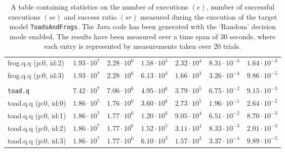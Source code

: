 \begin{table}[htbp]
{\begin{tabular}{lrrrrrr}
\hspace{3mm}frog.q.q (p:0, id:2)              & $1.93 \cdot 10^{7}$ & $2.28 \cdot 10^{6}$ & $1.58 \cdot 10^{5}$ & $2.32 \cdot 10^{4}$ & $8.31 \cdot 10^{-3}$ & $1.64 \cdot 10^{-3}$ \\
\hspace{3mm}frog.q.q (p:0, id:3)              & $1.93 \cdot 10^{7}$ & $2.28 \cdot 10^{6}$ & $6.13 \cdot 10^{3}$ & $1.66 \cdot 10^{3}$ & $3.26 \cdot 10^{-4}$ & $9.86 \cdot 10^{-5}$ \\
\\[-8pt]\texttt{toad.q}                       & $7.42 \cdot 10^{7}$ & $7.06 \cdot 10^{6}$ & $4.95 \cdot 10^{6}$ & $3.79 \cdot 10^{5}$ & $6.75 \cdot 10^{-2}$ & $9.15 \cdot 10^{-3}$ \\
\hspace{3mm}toad.q.q (p:0, id:0)              & $1.86 \cdot 10^{7}$ & $1.76 \cdot 10^{6}$ & $3.60 \cdot 10^{6}$ & $2.73 \cdot 10^{5}$ & $1.96 \cdot 10^{-1}$ & $2.64 \cdot 10^{-2}$ \\
\hspace{3mm}toad.q.q (p:0, id:1)              & $1.86 \cdot 10^{7}$ & $1.77 \cdot 10^{6}$ & $1.20 \cdot 10^{6}$ & $9.05 \cdot 10^{4}$ & $6.51 \cdot 10^{-2}$ & $8.70 \cdot 10^{-3}$ \\
\hspace{3mm}toad.q.q (p:0, id:2)              & $1.86 \cdot 10^{7}$ & $1.77 \cdot 10^{6}$ & $1.52 \cdot 10^{5}$ & $3.11 \cdot 10^{4}$ & $8.33 \cdot 10^{-3}$ & $2.01 \cdot 10^{-3}$ \\
\hspace{3mm}toad.q.q (p:0, id:3)              & $1.86 \cdot 10^{7}$ & $1.77 \cdot 10^{6}$ & $6.10 \cdot 10^{3}$ & $1.57 \cdot 10^{3}$ & $3.37 \cdot 10^{-4}$ & $9.89 \cdot 10^{-5}$ \\
\bottomrule
\end{tabular}
}
\caption{A table containing statistics on the number of executions $(e)$, number of successful executions $(se)$ and success ratio $(sr)$ measured during the execution of the target model \texttt{ToadsAndFrogs}. The Java code has been generated with the `Random' decision mode enabled. The results have been measured over a time span of 30 seconds, where each entry is represented by measurements taken over 20 trials.}
\label{table:frequency_results_toadsandfrogs_random}
\end{table}